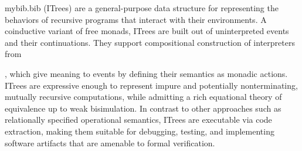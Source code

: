 \begin{filecontents}{mybib.bib}
            (ITrees) are a general-purpose data structure for representing the behaviors of recursive programs that interact with their environments. A coinductive variant of  free monads,  ITrees are built out of uninterpreted events and their continuations. They support compositional construction of interpreters from
            
            , which give meaning to events by defining their semantics as monadic actions. ITrees are expressive enough to represent impure and potentially nonterminating, mutually recursive computations, while admitting a rich equational theory of equivalence up to weak bisimulation. In contrast to other approaches such as relationally specified operational semantics, ITrees are executable via code extraction, making them suitable for debugging, testing, and implementing software artifacts that are amenable to formal verification.
          

\end{filecontents}
